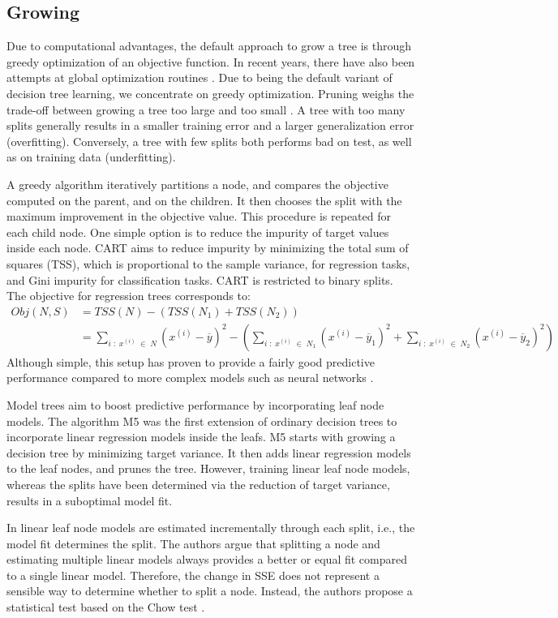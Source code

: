 \documentclass[a4paper, 11pt]{article}
\begin{document}
\subsection{Growing}

Due to computational advantages, the default approach to grow a tree is through greedy optimization of an objective function. In recent years, there have also been attempts at global optimization routines \cite{norouzi_nongreedy_tree}. Due to being the default variant of decision tree learning, we concentrate on greedy optimization. Pruning weighs the trade-off between growing a tree too large and too small \cite{hastie_elemstatlearn}. A tree with too many splits generally results in a smaller training error and a larger generalization error (overfitting). Conversely, a tree with few splits both performs bad on test, as well as on training data (underfitting). 
\par
A greedy algorithm iteratively partitions a node, and compares the objective computed on the parent, and on the children. It then chooses the split with the maximum improvement in the objective value. This procedure is repeated for each child node. One simple option is to reduce the impurity of target values inside each node. CART aims to reduce impurity by minimizing the total sum of squares (TSS), which is proportional to the sample variance, for regression tasks, and Gini impurity for classification tasks. CART is restricted to binary splits. The objective for regression trees corresponds to:
\begin{align*}
Obj(N, S) &= TSS(N) - (TSS(N_1) + TSS(N_2)) \\
 &= \sum_{i \;:\; x^{(i)} \;\in\; N} \left(x^{(i)} - \overline{y}\right)^2 - \left(\sum_{i \;:\; x^{(i)} \;\in\; N_1} \left(x^{(i)} - \overline{y}_1\right)^2 + \sum_{i \;:\; x^{(i)} \;\in\; N_2} \left(x^{(i)} - \overline{y}_2\right)^2 \right)
\end{align*}
Although simple, this setup has proven to provide a fairly good predictive performance compared to more complex models such as neural networks \cite{razi_cart_comparison}.
\par
Model trees aim to boost predictive performance by incorporating leaf node models. The algorithm M5 \cite{quinlan_model_tree} was the first extension of ordinary decision trees to incorporate linear regression models inside the leafs.
M5 starts with growing a decision tree by minimizing target variance. It then adds linear regression models to the leaf nodes, and prunes the tree. However, training linear leaf node models, whereas the splits have been determined via the reduction of target variance, results in a suboptimal model fit.
\par
In \cite{potts_incremental_model_tree} linear leaf node models are estimated incrementally through each split, i.e., the model fit determines the split. The authors argue that splitting a node and estimating multiple linear models always provides a better or equal fit compared to a single linear model. Therefore, the change in SSE does not represent a sensible way to determine whether to split a node.
Instead, the authors propose a statistical test based on the Chow test \cite{chow_inequality_test}.
\end{document}
